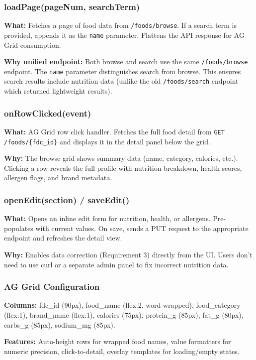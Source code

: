 \documentclass[12pt,a4paper]{article}
\begin{document}
\subsubsection{loadPage(pageNum, searchTerm)}
\textbf{What:} Fetches a page of food data from \texttt{/foods/browse}. If a search term is provided, appends it as the \texttt{name} parameter. Flattens the API response for AG Grid consumption.

\textbf{Why unified endpoint:} Both browse and search use the same \texttt{/foods/browse} endpoint. The \texttt{name} parameter distinguishes search from browse. This ensures search results include nutrition data (unlike the old \texttt{/foods/search} endpoint which returned lightweight results).

\subsubsection{onRowClicked(event)}
\textbf{What:} AG Grid row click handler. Fetches the full food detail from \texttt{GET /foods/\{fdc\_id\}} and displays it in the detail panel below the grid.

\textbf{Why:} The browse grid shows summary data (name, category, calories, etc.). Clicking a row reveals the full profile with nutrition breakdown, health scores, allergen flags, and brand metadata.

\subsubsection{openEdit(section) / saveEdit()}
\textbf{What:} Opens an inline edit form for nutrition, health, or allergens. Pre-populates with current values. On save, sends a PUT request to the appropriate endpoint and refreshes the detail view.

\textbf{Why:} Enables data correction (Requirement 3) directly from the UI. Users don't need to use curl or a separate admin panel to fix incorrect nutrition data.

\subsubsection{AG Grid Configuration}
\textbf{Columns:} fdc\_id (90px), food\_name (flex:2, word-wrapped), food\_category (flex:1), brand\_name (flex:1), calories (75px), protein\_g (85px), fat\_g (80px), carbs\_g (85px), sodium\_mg (85px).

\textbf{Features:} Auto-height rows for wrapped food names, value formatters for numeric precision, click-to-detail, overlay templates for loading/empty states.
\end{document}
